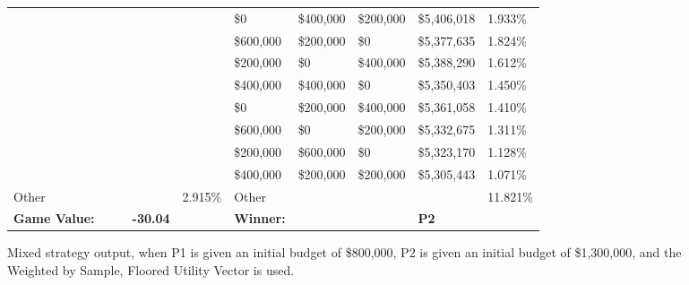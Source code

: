 \documentclass[11pt]{article}
\begin{document}
\begin{figure}
\begin{tabular}{ |p{1.0cm}p{1.0cm}p{1.0cm}p{2.0cm}|p{1.0cm}||p{1.0cm}p{1.0cm}p{1.0cm}p{2.0cm}|p{1.0cm}|}
&&&&&\$0 & \$400,000 & \$200,000 & \$5,406,018 & 1.933\% \\
&&&&&\$600,000 & \$200,000 & \$0 & \$5,377,635 & 1.824\% \\
&&&&&\$200,000 & \$0 & \$400,000 & \$5,388,290 & 1.612\% \\
&&&&&\$400,000 & \$400,000 & \$0 & \$5,350,403 & 1.450\% \\
&&&&&\$0 & \$200,000 & \$400,000 & \$5,361,058 & 1.410\% \\
&&&&&\$600,000 & \$0 & \$200,000 & \$5,332,675 & 1.311\% \\
&&&&&\$200,000 & \$600,000 & \$0 & \$5,323,170 & 1.128\% \\
&&&&&\$400,000 & \$200,000 & \$200,000 & \$5,305,443 & 1.071\% \\
\hline
Other &&&& 2.915\% & Other &&&& 11.821\% \\
\hline
\small \textbf{Game Value:} &&& \small \textbf{-30.04} && \small \textbf{Winner:} &&& \small \textbf{P2}&\\
\hline
\end{tabular}
\caption{Mixed strategy output, when P1 is given an initial budget of \$800,000, P2 is given an initial budget of \$1,300,000, and the Weighted by Sample, Floored Utility Vector is used.}
\label{8v13table.3}
\end{figure}
\end{document}
